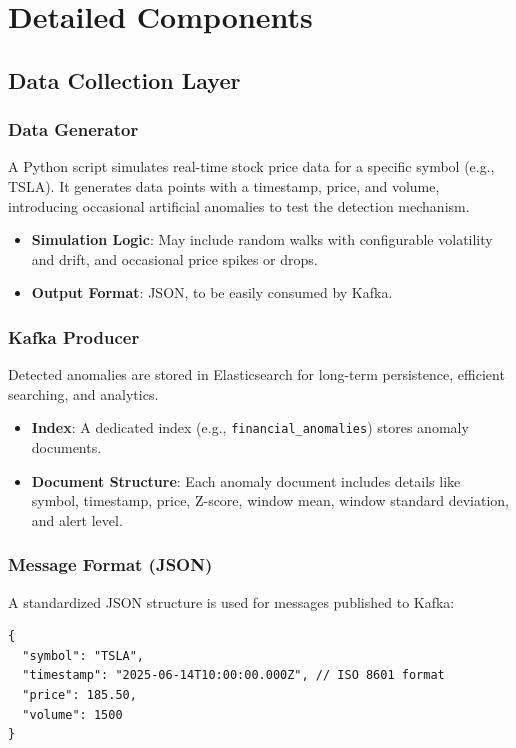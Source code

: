 \section{Detailed Components}

\subsection{Data Collection Layer}

\subsubsection{Data Generator}

A Python script simulates real-time stock price data for a specific symbol (e.g., TSLA). It generates data points with a timestamp, price, and volume, introducing occasional artificial anomalies to test the detection mechanism.
\begin{itemize}
    \item \textbf{Simulation Logic}: May include random walks with configurable volatility and drift, and occasional price spikes or drops.
    \item \textbf{Output Format}: JSON, to be easily consumed by Kafka.
\end{itemize}

\subsubsection{Kafka Producer}

Detected anomalies are stored in Elasticsearch for long-term persistence, efficient searching, and analytics.
\begin{itemize}
    \item \textbf{Index}: A dedicated index (e.g., \texttt{financial\_anomalies}) stores anomaly documents.
    \item \textbf{Document Structure}: Each anomaly document includes details like symbol, timestamp, price, Z-score, window mean, window standard deviation, and alert level.
\end{itemize}
\subsubsection{Message Format (JSON)}

A standardized JSON structure is used for messages published to Kafka:
\begin{verbatim}
{
  "symbol": "TSLA",
  "timestamp": "2025-06-14T10:00:00.000Z", // ISO 8601 format
  "price": 185.50,
  "volume": 1500
}
\end{verbatim}

